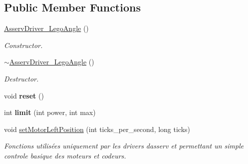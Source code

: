 \subsection*{Public Member Functions}
\begin{DoxyCompactItemize}
\item 
\mbox{\label{classAsservDriver__LegoAngle_abcaf90ba60db493a0230259e2295b275}} 
\hyperlink{classAsservDriver__LegoAngle_abcaf90ba60db493a0230259e2295b275}{Asserv\+Driver\+\_\+\+Lego\+Angle} ()
\begin{DoxyCompactList}\small\item\em Constructor. \end{DoxyCompactList}\item 
\mbox{\label{classAsservDriver__LegoAngle_a768b218aa97bcabe678e75cf06f61804}} 
\hyperlink{classAsservDriver__LegoAngle_a768b218aa97bcabe678e75cf06f61804}{$\sim$\+Asserv\+Driver\+\_\+\+Lego\+Angle} ()
\begin{DoxyCompactList}\small\item\em Destructor. \end{DoxyCompactList}\item 
\mbox{\label{classAsservDriver__LegoAngle_add54e9002df1db6fe1bf090804d93ebf}} 
void {\bfseries reset} ()
\item 
\mbox{\label{classAsservDriver__LegoAngle_adc782c6a85091df8cae713bd5073c95d}} 
int {\bfseries limit} (int power, int max)
\item 
\mbox{\label{classAsservDriver__LegoAngle_aea8ebb3e38a1bffb1f2bf2a5adaad02e}} 
void \hyperlink{classAsservDriver__LegoAngle_aea8ebb3e38a1bffb1f2bf2a5adaad02e}{set\+Motor\+Left\+Position} (int ticks\+\_\+per\+\_\+second, long ticks)
\begin{DoxyCompactList}\small\item\em Fonctions utilisées uniquement par les drivers d\textquotesingle{}asserv et permettant un simple controle basique des moteurs et codeurs. \end{DoxyCompactList}\item 
\mbox{\label{classAsservDriver__LegoAngle_a74df35a0c38e45251ad8895faa25bed8}} 

\end{DoxyCompactItemize}
